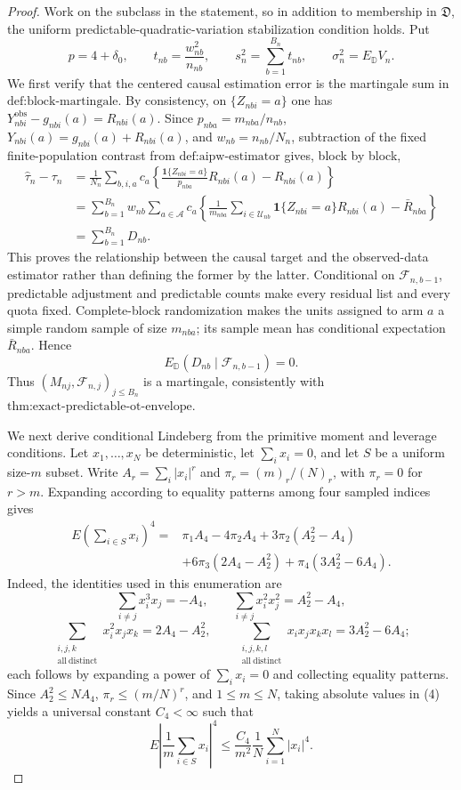 \documentclass{article}
\begin{document}
\begin{proof}
Work on the subclass in the statement, so in addition to membership in \(\mathfrak D\), the uniform predictable-quadratic-variation stabilization condition holds.  Put
\[
p=4+\delta _0,\qquad t_{nb}=\frac{w_{nb}^{2}}{n_{nb}},\qquad
s_n^2=\sum_{b=1}^{B_n}t_{nb},\qquad \sigma_n^2=E_{\mathbb D}V_n.
\tag{1}
\]
We first verify that the centered causal estimation error is the martingale sum in \(\text{def:block-martingale}\).  By consistency, on \(\{Z_{nbi}=a\}\) one has \(Y_{nbi}^{\mathrm{obs}}-g_{nbi}(a)=R_{nbi}(a)\).  Since \(p_{nba}=m_{nba}/n_{nb}\), \(Y_{nbi}(a)=g_{nbi}(a)+R_{nbi}(a)\), and \(w_{nb}=n_{nb}/N_n\), subtraction of the fixed finite-population contrast from \(\text{def:aipw-estimator}\) gives, block by block,
\[
\begin{aligned}
\widehat\tau_n-\tau_n
&=\frac1{N_n}\sum_{b,i,a}c_a
 \left\{\frac{\mathbf 1\{Z_{nbi}=a\}}{p_{nba}}R_{nbi}(a)-R_{nbi}(a)\right\}\\
&=\sum_{b=1}^{B_n}w_{nb}\sum_{a\in\mathcal A}c_a
 \left\{\frac1{m_{nba}}\sum_{i\in\mathcal U_{nb}}
 \mathbf 1\{Z_{nbi}=a\}R_{nbi}(a)-\bar R_{nba}\right\}\\
&=\sum_{b=1}^{B_n}D_{nb}.
\end{aligned}
\tag{2}
\]
This proves the relationship between the causal target and the observed-data estimator rather than defining the former by the latter.  Conditional on \(\mathcal F_{n,b-1}\), predictable adjustment and predictable counts make every residual list and every quota fixed.  Complete-block randomization makes the units assigned to arm \(a\) a simple random sample of size \(m_{nba}\); its sample mean has conditional expectation \(\bar R_{nba}\).  Hence
\[
E_{\mathbb D}(D_{nb}\mid\mathcal F_{n,b-1})=0.
\tag{3}
\]
Thus \((M_{nj},\mathcal F_{n,j})_{j\le B_n}\) is a martingale, consistently with \(\text{thm:exact-predictable-ot-envelope}\).

We next derive conditional Lindeberg from the primitive moment and leverage conditions.  Let \(x_1,\ldots,x_N\) be deterministic, let \(\sum_i x_i=0\), and let \(S\) be a uniform size-\(m\) subset.  Write \(A_r=\sum_i|x_i|^r\) and \(\pi_r=(m)_r/(N)_r\), with \(\pi_r=0\) for \(r>m\).  Expanding according to equality patterns among four sampled indices gives
\[
\begin{aligned}
E\left(\sum_{i\in S}x_i\right)^4
={}&\pi_1A_4-4\pi_2A_4+3\pi_2(A_2^2-A_4)\\
&+6\pi_3(2A_4-A_2^2)+\pi_4(3A_2^2-6A_4).
\end{aligned}
\tag{4}
\]
Indeed, the identities used in this enumeration are
\[
\sum_{i\ne j}x_i^3x_j=-A_4,
\qquad
\sum_{i\ne j}x_i^2x_j^2=A_2^2-A_4,
\tag{5}
\]
\[
\sum_{\substack{i,j,k\\\mathrm{all\ distinct}}}x_i^2x_jx_k
=2A_4-A_2^2,
\qquad
\sum_{\substack{i,j,k,l\\\mathrm{all\ distinct}}}x_ix_jx_kx_l
=3A_2^2-6A_4;
\tag{6}
\]
each follows by expanding a power of \(\sum_i x_i=0\) and collecting equality patterns.  Since \(A_2^2\le NA_4\), \(\pi_r\le(m/N)^r\), and \(1\le m\le N\), taking absolute values in (4) yields a universal constant \(C_4<\infty\) such that
\[
E\left|\frac1m\sum_{i\in S}x_i\right|^4
\le \frac{C_4}{m^2}\frac1N\sum_{i=1}^N|x_i|^4.
\tag{7}
\]


\end{proof}
\end{document}
